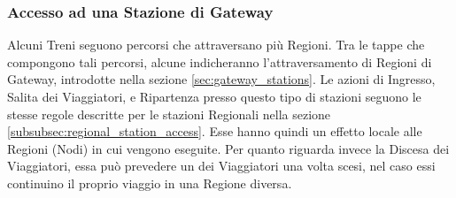 	\subsubsection{Accesso ad una Stazione di Gateway}\label{subsubsec:gateway_stations_func}
	
	Alcuni Treni seguono percorsi che attraversano più Regioni. Tra le tappe che compongono tali percorsi, alcune indicheranno l'attraversamento di Regioni di Gateway, introdotte nella sezione \ref{sec:gateway_stations}. 
	Le azioni di Ingresso, Salita dei Viaggiatori, e Ripartenza presso questo tipo di stazioni seguono le stesse regole descritte per le stazioni Regionali nella sezione \ref{subsubsec:regional_station_access}. Esse hanno quindi un effetto locale alle Regioni (Nodi) in cui vengono eseguite.
	Per quanto riguarda invece la Discesa dei Viaggiatori, essa può prevedere un  dei Viaggiatori una volta scesi, nel caso essi continuino il proprio viaggio in una Regione diversa.
	

